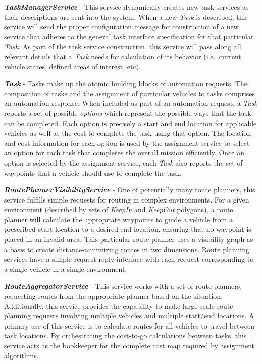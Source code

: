 \textbf{\emph{TaskManagerService}} - This service dynamically creates
new task services as their descriptions are sent into the system. When a
new \emph{Task} is described, this service will send the proper
configuration message for construction of a new service that adheres to
the general task interface specification for that particular
\emph{Task}. As part of the task service construction, this service will
pass along all relevant details that a \emph{Task} needs for calculation
of its behavior (i.e.~current vehicle states, defined areas of interest,
etc).

\textbf{\emph{Task}} - Tasks make up the atomic building blocks of
automation requests. The composition of tasks and the assignment of
particular vehicles to tasks comprises an automation response. When
included as part of an automation request, a \emph{Task} reports a set
of possible \emph{options} which represent the possible ways that the
task can be completed. Each option is precisely a start and end location
for applicable vehicles as well as the cost to complete the task using
that option. The location and cost information for each option is used
by the assignment service to select an option for each task that
completes the overall mission efficiently. Once an option is selected by
the assignment service, each \emph{Task} also reports the set of
waypoints that a vehicle should use to complete the task.

\textbf{\emph{RoutePlannerVisibilityService}} - One of potentially many
route planners, this service fulfills simple requests for routing in
complex environments. For a given environment (described by sets of
\emph{KeepIn} and \emph{KeepOut} polygons), a route planner will
calculate the appropriate waypoints to guide a vehicle from a prescribed
start location to a desired end location, ensuring that no waypoint is
placed in an invalid area. This particular route planner uses a
visibility graph as a basis to create distance-minimizing routes in two
dimensions. Route planning services have a simple request-reply
interface with each request corresponding to a single vehicle in a
single environment.

\textbf{\emph{RouteAggregatorService}} - This service works with a set
of route planners, requesting routes from the appropriate planner based
on the situation. Additionally, this service provides the capability to
make large-scale route planning requests involving multiple vehicles and
multiple start/end locations. A primary use of this service is to
calculate routes for all vehicles to travel between task locations. By
orchestrating the cost-to-go calculations between tasks, this service
acts as the bookkeeper for the complete cost map required by assignment
algorithms.

